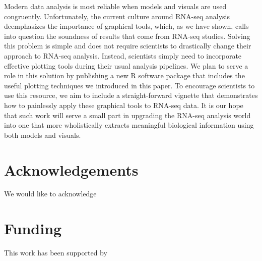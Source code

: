 \documentclass{bioinfo}
\begin{document}
Modern data analysis is most reliable when models and visuals are used congruently. Unfortunately, the current culture around RNA-seq analysis deemphasizes the importance of graphical tools, which, as we have shown, calls into question the soundness of results that come from RNA-seq studies. Solving this problem is simple and does not require scientists to drastically change their approach to RNA-seq analysis. Instead, scientists simply need to incorporate effective plotting tools during their usual analysis pipelines. We plan to serve a role in this solution by publishing a new \textsf{R} software package that includes the useful plotting techniques we introduced in this paper. To encourage scientists to use this resource, we aim to include a straight-forward vignette that demonstrates how to painlessly apply these graphical tools to RNA-seq data. It is our hope that such work will serve a small part in upgrading the RNA-seq analysis world into one that more wholistically extracts meaningful biological information using both models and visuals.

\section*{Acknowledgements}

We would like to acknowledge 

\section*{Funding}

This work has been supported by
\end{document}
